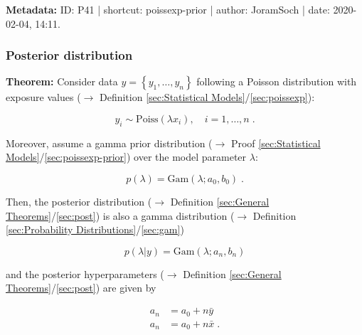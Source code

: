 \documentclass[a4paper,12pt,twoside]{book}
\begin{document}
\vspace{1em}
\textbf{Metadata:} ID: P41 | shortcut: poissexp-prior | author: JoramSoch | date: 2020-02-04, 14:11.
\vspace{1em}



\subsubsection[\textbf{Posterior distribution}]{Posterior distribution} \label{sec:poissexp-post}
\setcounter{equation}{0}

\textbf{Theorem:} Consider data $y = \left\lbrace y_1, \ldots, y_n \right\rbrace$ following a Poisson distribution with exposure values ($\rightarrow$ Definition \ref{sec:Statistical Models}/\ref{sec:poissexp}):

\begin{equation} \label{eq:poissexp-post-Poiss-exp}
y_i \sim \mathrm{Poiss}(\lambda x_i), \quad i = 1, \ldots, n \; .
\end{equation}

Moreover, assume a gamma prior distribution ($\rightarrow$ Proof \ref{sec:Statistical Models}/\ref{sec:poissexp-prior}) over the model parameter $\lambda$:

\begin{equation} \label{eq:poissexp-post-Poiss-exp-prior}
p(\lambda) = \mathrm{Gam}(\lambda; a_0, b_0) \; .
\end{equation}

Then, the posterior distribution ($\rightarrow$ Definition \ref{sec:General Theorems}/\ref{sec:post}) is also a gamma distribution ($\rightarrow$ Definition \ref{sec:Probability Distributions}/\ref{sec:gam})

\begin{equation} \label{eq:poissexp-post-Poiss-exp-post}
p(\lambda|y) = \mathrm{Gam}(\lambda; a_n, b_n)
\end{equation}

and the posterior hyperparameters ($\rightarrow$ Definition \ref{sec:General Theorems}/\ref{sec:post}) are given by

\begin{equation} \label{eq:poissexp-post-Poiss-exp-post-par}
\begin{split}
a_n &= a_0 + n \bar{y} \\
a_n &= a_0 + n \bar{x} \; .
\end{split}
\end{equation}
\end{document}
